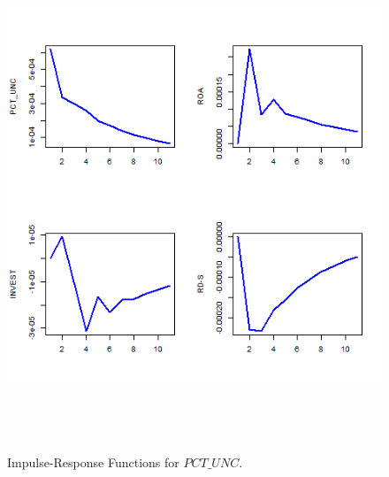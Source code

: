 \begin{figure}[H] 
\centering
\includegraphics[width=6in, height=6in]{figures/punc-irf-2}
\captionsetup{justification=centering, width=.95\textwidth} 
\caption{\footnotesize Impulse-Response Functions for $PCT\_UNC$.} \label{punc-irf-2}
\end{figure} 
 \newpage
